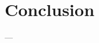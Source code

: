 %
%
%
%
%
%
%
%
%
%
%

%
%

\section{Conclusion}\label{sec:methodology-conclusion}

---

\cleardoublepage
